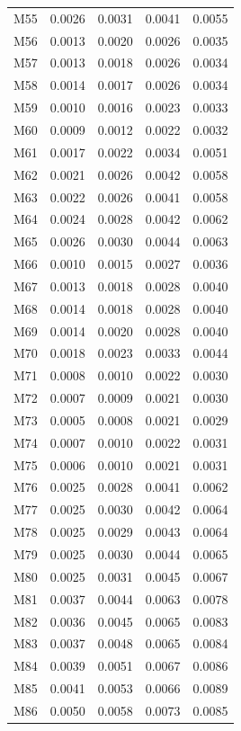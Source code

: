 \begin{longtable}{lrrrr}
M55 & 0.0026 & 0.0031 & 0.0041 & 0.0055 \\
M56 & 0.0013 & 0.0020 & 0.0026 & 0.0035 \\
M57 & 0.0013 & 0.0018 & 0.0026 & 0.0034 \\
M58 & 0.0014 & 0.0017 & 0.0026 & 0.0034 \\
M59 & 0.0010 & 0.0016 & 0.0023 & 0.0033 \\
M60 & 0.0009 & 0.0012 & 0.0022 & 0.0032 \\
M61 & 0.0017 & 0.0022 & 0.0034 & 0.0051 \\
M62 & 0.0021 & 0.0026 & 0.0042 & 0.0058 \\
M63 & 0.0022 & 0.0026 & 0.0041 & 0.0058 \\
M64 & 0.0024 & 0.0028 & 0.0042 & 0.0062 \\
M65 & 0.0026 & 0.0030 & 0.0044 & 0.0063 \\
M66 & 0.0010 & 0.0015 & 0.0027 & 0.0036 \\
M67 & 0.0013 & 0.0018 & 0.0028 & 0.0040 \\
M68 & 0.0014 & 0.0018 & 0.0028 & 0.0040 \\
M69 & 0.0014 & 0.0020 & 0.0028 & 0.0040 \\
M70 & 0.0018 & 0.0023 & 0.0033 & 0.0044 \\
M71 & 0.0008 & 0.0010 & 0.0022 & 0.0030 \\
M72 & 0.0007 & 0.0009 & 0.0021 & 0.0030 \\
M73 & 0.0005 & 0.0008 & 0.0021 & 0.0029 \\
M74 & 0.0007 & 0.0010 & 0.0022 & 0.0031 \\
M75 & 0.0006 & 0.0010 & 0.0021 & 0.0031 \\
M76 & 0.0025 & 0.0028 & 0.0041 & 0.0062 \\
M77 & 0.0025 & 0.0030 & 0.0042 & 0.0064 \\
M78 & 0.0025 & 0.0029 & 0.0043 & 0.0064 \\
M79 & 0.0025 & 0.0030 & 0.0044 & 0.0065 \\
M80 & 0.0025 & 0.0031 & 0.0045 & 0.0067 \\
M81 & 0.0037 & 0.0044 & 0.0063 & 0.0078 \\
M82 & 0.0036 & 0.0045 & 0.0065 & 0.0083 \\
M83 & 0.0037 & 0.0048 & 0.0065 & 0.0084 \\
M84 & 0.0039 & 0.0051 & 0.0067 & 0.0086 \\
M85 & 0.0041 & 0.0053 & 0.0066 & 0.0089 \\
M86 & 0.0050 & 0.0058 & 0.0073 & 0.0085 \\

\end{longtable}
